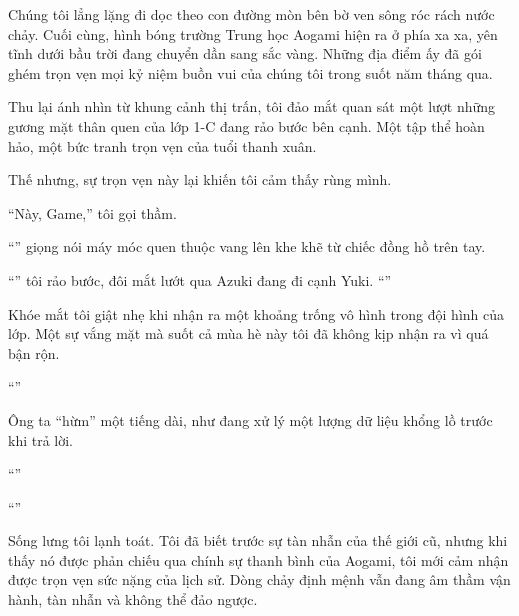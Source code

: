 \documentclass[../main.tex]{subfiles}
\begin{document}
Chúng tôi lẳng lặng đi dọc theo con đường mòn bên bờ ven sông róc rách nước chảy. Cuối cùng, hình bóng trường Trung học Aogami hiện ra ở phía xa xa, yên tĩnh dưới bầu trời đang chuyển dần sang sắc vàng. Những địa điểm ấy đã gói ghém trọn vẹn mọi kỷ niệm buồn vui của chúng tôi trong suốt năm tháng qua.

Thu lại ánh nhìn từ khung cảnh thị trấn, tôi đảo mắt quan sát một lượt những gương mặt thân quen của lớp 1-C đang rảo bước bên cạnh. Một tập thể hoàn hảo, một bức tranh trọn vẹn của tuổi thanh xuân.

Thế nhưng, sự trọn vẹn này lại khiến tôi cảm thấy rùng mình.

``Này, Game,'' tôi gọi thầm.

``'' giọng nói máy móc quen thuộc vang lên khe khẽ từ chiếc đồng hồ trên tay.

``'' tôi rảo bước, đôi mắt lướt qua Azuki đang đi cạnh Yuki. ``''

Khóe mắt tôi giật nhẹ khi nhận ra một khoảng trống vô hình trong đội hình của lớp. Một sự vắng mặt mà suốt cả mùa hè này tôi đã không kịp nhận ra vì quá bận rộn.

``''

Ông ta ``hừm'' một tiếng dài, như đang xử lý một lượng dữ liệu khổng lồ trước khi trả lời.

``''

``''

Sống lưng tôi lạnh toát. Tôi đã biết trước sự tàn nhẫn của thế giới cũ, nhưng khi thấy nó được phản chiếu qua chính sự thanh bình của Aogami, tôi mới cảm nhận được trọn vẹn sức nặng của lịch sử. Dòng chảy định mệnh vẫn đang âm thầm vận hành, tàn nhẫn và không thể đảo ngược.
\end{document}
